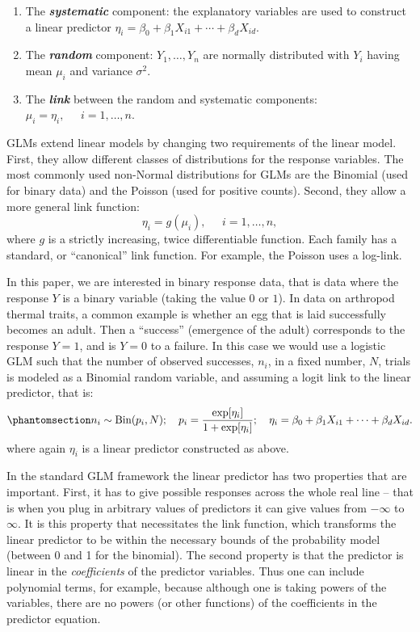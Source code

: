 \documentclass[
  11pt,
  letterpaper,
]{article}
\providecommand{\tightlist}{%
  \setlength{\itemsep}{0pt}\setlength{\parskip}{0pt}}
\begin{document}
\begin{enumerate}
\def\labelenumi{\arabic{enumi}.}
\tightlist
\item
  The \textbf{\emph{systematic}} component: the explanatory variables
  are used to construct a linear predictor
  \(\eta_i = \beta_0 + \beta_1 X_{i1} + \cdots + \beta_d X_{id}.\)
\item
  The \textbf{\emph{random}} component: \(Y_1,\dots,Y_n\) are normally
  distributed with \(Y_i\) having mean \(\mu_i\) and variance
  \(\sigma^2\).
\item
  The \textbf{\emph{link}} between the random and systematic components:
  \(\mu_i = \eta_i, \;\;\;\;\; i=1,\dots,n\).
\end{enumerate}

GLMs extend linear models by changing two requirements of the linear
model. First, they allow different classes of distributions for the
response variables. The most commonly used non-Normal distributions for
GLMs are the Binomial (used for binary data) and the Poisson (used for
positive counts). Second, they allow a more general link function: \[
\eta_i = g(\mu_i), \;\;\;\;\; i=1,\dots,n,
\] where \(g\) is a strictly increasing, twice differentiable function.
Each family has a standard, or ``canonical'' link function. For example,
the Poisson uses a log-link.

In this paper, we are interested in binary response data, that is data
where the response \(Y\) is a binary variable (taking the value \(0\) or
\(1\)). In data on arthropod thermal traits, a common example is whether
an egg that is laid successfully becomes an adult. Then a ``success''
(emergence of the adult) corresponds to the response \(Y=1\), and is
\(Y=0\) to a failure. In this case we would use a logistic GLM such that
the number of observed successes, \(n_i\), in a fixed number, \(N\),
trials is modeled as a Binomial random variable, and assuming a logit
link to the linear predictor, that is:
\begin{equation}\phantomsection\label{eq-logistic}{
n_i \sim \mathrm{Bin}(p_i, N); ~~~ p_i = \frac{\exp[\eta_i]}{1+\exp[\eta_i]}; ~~~ \eta_i = \beta_0 + \beta_1 X_{i1} + \cdots + \beta_d X_{id}. 
}\end{equation} where again \(\eta_i\) is a linear predictor constructed
as above.

In the standard GLM framework the linear predictor has two properties
that are important. First, it has to give possible responses across the
whole real line -- that is when you plug in arbitrary values of
predictors it can give values from \(-\infty\) to \(\infty\). It is this
property that necessitates the link function, which transforms the
linear predictor to be within the necessary bounds of the probability
model (between 0 and 1 for the binomial). The second property is that
the predictor is linear in the \emph{coefficients} of the predictor
variables. Thus one can include polynomial terms, for example, because
although one is taking powers of the variables, there are no powers (or
other functions) of the coefficients in the predictor equation.
\end{document}
